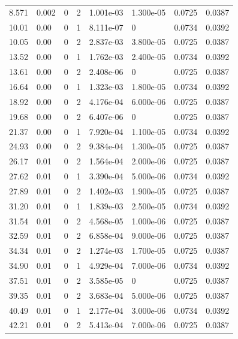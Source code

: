 \documentclass[preview]{standalone}
\begin{document}
{{\begin{tabular}{L{1.2cm}C{1.2cm} C{0.3cm}C{0.5cm} C{1.4cm}C{1.4cm} C{1.4cm}C{1.4cm}}
  8.571  &  0.002  & 0     &  2 &  1.001e-03  & 1.300e-05  & 0.0725 &  0.0387   \\ 
  10.01  &  0.00  & 0     &  1 &  8.111e-07  & 0  & 0.0734 &  0.0392   \\ 
  10.05  &  0.00  & 0     &  2 &  2.837e-03  & 3.800e-05  & 0.0725 &  0.0387   \\ 
  13.52  &  0.00  & 0     &  1 &  1.762e-03  & 2.400e-05  & 0.0734 &  0.0392   \\ 
  13.61  &  0.00  & 0     &  2 &  2.408e-06  & 0  & 0.0725 &  0.0387   \\ 
  16.64  &  0.00  & 0     &  1 &  1.323e-03  & 1.800e-05  & 0.0734 &  0.0392   \\ 
  18.92  &  0.00  & 0     &  2 &  4.176e-04  & 6.000e-06  & 0.0725 &  0.0387   \\ 
  19.68  &  0.00  & 0     &  2 &  6.407e-06  & 0  & 0.0725 &  0.0387   \\ 
  21.37  &  0.00  & 0     &  1 &  7.920e-04  & 1.100e-05  & 0.0734 &  0.0392   \\ 
  24.93  &  0.00  & 0     &  2 &  9.384e-04  & 1.300e-05  & 0.0725 &  0.0387   \\ 
  26.17  &  0.01  & 0     &  2 &  1.564e-04  & 2.000e-06  & 0.0725 &  0.0387   \\ 
  27.62  &  0.01  & 0     &  1 &  3.390e-04  & 5.000e-06  & 0.0734 &  0.0392   \\ 
  27.89  &  0.01  & 0     &  2 &  1.402e-03  & 1.900e-05  & 0.0725 &  0.0387   \\ 
  31.20  &  0.01  & 0     &  1 &  1.839e-03  & 2.500e-05  & 0.0734 &  0.0392   \\ 
  31.54  &  0.01  & 0     &  2 &  4.568e-05  & 1.000e-06  & 0.0725 &  0.0387   \\ 
  32.59  &  0.01  & 0     &  2 &  6.858e-04  & 9.000e-06  & 0.0725 &  0.0387   \\ 
  34.34  &  0.01  & 0     &  2 &  1.274e-03  & 1.700e-05  & 0.0725 &  0.0387   \\ 
  34.90  &  0.01  & 0     &  1 &  4.929e-04  & 7.000e-06  & 0.0734 &  0.0392   \\ 
  37.51  &  0.01  & 0     &  2 &  3.585e-05  & 0  & 0.0725 &  0.0387   \\ 
  39.35  &  0.01  & 0     &  2 &  3.683e-04  & 5.000e-06  & 0.0725 &  0.0387   \\ 
  40.49  &  0.01  & 0     &  1 &  2.177e-04  & 3.000e-06  & 0.0734 &  0.0392   \\ 
  42.21  &  0.01  & 0     &  2 &  5.413e-04  & 7.000e-06  & 0.0725 &  0.0387   \\ 

\end{tabular}}}
\end{document}
